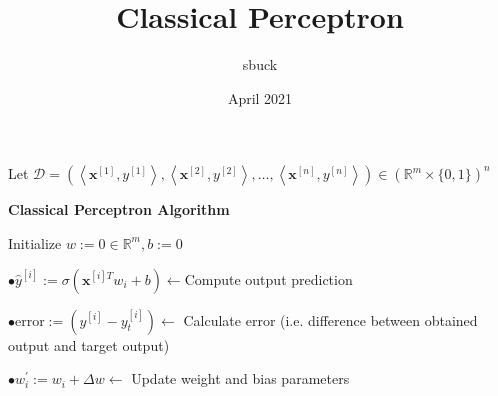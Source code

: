 \documentclass{article}
\title{Classical Perceptron}
\author{sbuck}
\date{April 2021}
\begin{document}

\begin{algorithm}
 
	Let $\mathcal{D}=\left(\left\langle\mathbf{x}^{[1]},y^{[1]}\right\rangle,\left\langle\mathbf{x}^{[2]}, y^{[2]}\right\rangle,\ldots,\left\langle\mathbf{x}^{[n]},y^{[n]}\right\rangle\right) \in\left(\mathbb{R}^{m} \times\{0,1\}\right)^{n}$
	\vspace{5pt}
	
	\begin{algorithmic}[1]
	\caption*{\textbf{Classical Perceptron Algorithm}} 
    
		\State Initialize ${w}:={0} \in 
		\mathbb{R}^{m}, {b}:=0$
		
		\vspace{5pt}
		\Statex \vspace{3pt} \hspace{2pt} $\bullet
		 \hat{y}^{[i]}:=\sigma\left(\mathbf{x}^{[i]T} {w}_{i}+b\right) \leftarrow$Compute output prediction

        \Statex \hspace{2pt} $\bullet \mathrm{error}:=\left({y}^{[i]}-{y}_{t}^{[i]}\right) \leftarrow$ Calculate error (i.e. difference between obtained output and target output)

        \Statex \hspace{2pt} $\bullet {w}_{i}^{'}:={w}_{i}+\Delta{w}  \leftarrow$ Update weight and bias parameters
 
        \EndFor
        
        \EndFor
        
	\end{algorithmic}
\end{algorithm}


\end{document}

